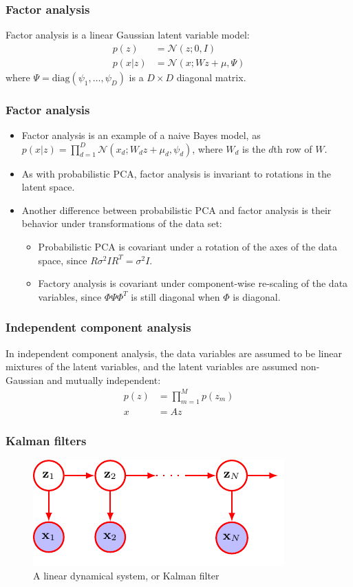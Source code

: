 \documentclass{beamer}
\begin{document}
\begin{frame}
    \frametitle{Factor analysis}
    Factor analysis is a linear Gaussian latent variable model:
    \begin{align*}
        p(z)&=\mathcal{N}(z;0,I) \\
        p(x|z)&=\mathcal{N}(x;Wz+\mu,\Psi)
    \end{align*}
    where $\Psi=\mathrm{diag}(\psi_{1},\hdots,\psi_{D})$ is a $D\times{}D$ diagonal matrix.
\end{frame}

\begin{frame}
    \frametitle{Factor analysis}
    \begin{itemize}
        \item Factor analysis is an example of a naive Bayes model, as $p(x|z)=\prod_{d=1}^{D}\mathcal{N}(x_{d};W_{d}z+\mu_{d},\psi_{d})$, where $W_{d}$ is the $d$th row of $W$.
        \item As with probabilistic PCA, factor analysis is invariant to rotations in the latent space.
        \item Another difference between probabilistic PCA and factor analysis is their behavior under transformations of the data set:
        \begin{itemize}
            \item Probabilistic PCA is covariant under a rotation of the axes of the data space, since $R\sigma^{2}IR^{T}=\sigma^{2}I$.
            \item Factory analysis is covariant under component-wise re-scaling of the data variables, since $\Phi\Psi\Phi^{T}$ is still diagonal when $\Phi$ is diagonal.
        \end{itemize}
    \end{itemize}
\end{frame}

\begin{frame}
    \frametitle{Independent component analysis}
    In independent component analysis, the data variables are assumed to be linear mixtures of the latent variables, and the latent variables are assumed non-Gaussian and mutually independent:
    \begin{align*}
        p(z)&=\prod_{m=1}^{M}p(z_{m}) \\
        x&=Az
    \end{align*}
\end{frame}

\begin{frame}
    \frametitle{Kalman filters}
    \begin{figure}
        \caption{A linear dynamical system, or Kalman filter}
        \includegraphics{Figure_9.pdf}
    \end{figure}
\end{frame}
\end{document}
